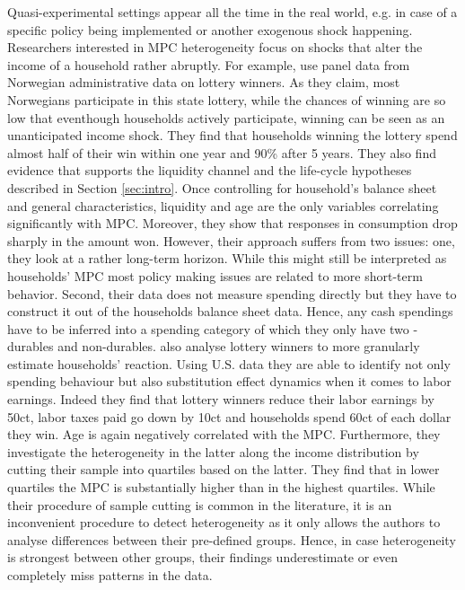 Quasi-experimental settings appear all the time in the real world, e.g. in case of a specific policy being implemented or another exogenous shock happening. Researchers interested in MPC heterogeneity focus on shocks that alter the income of a household rather abruptly. For example, \cite{fagereng_etal} use panel data from Norwegian administrative data on lottery winners. As they claim, most Norwegians participate in this state lottery, while the chances of winning are so low that eventhough households actively participate, winning can be seen as an unanticipated income shock. They find that households winning the lottery spend almost half of their win within one year and 90\% after 5 years. They also find evidence that supports the liquidity channel and the life-cycle hypotheses described in Section \ref{sec:intro}. Once controlling for household's balance sheet and general characteristics, liquidity and age are the only variables correlating significantly with MPC. Moreover, they show that responses in consumption drop sharply in the amount won. However, their approach suffers from two issues: one, they look at a rather long-term horizon. While this might still be interpreted as households' MPC most policy making issues are related to more short-term behavior. Second, their data does not measure spending directly but they have to construct it out of the households balance sheet data. Hence, any cash spendings have to be inferred into a spending category of which they only have two - durables and non-durables. \cite{golosov_etal} also analyse lottery winners to more granularly estimate households' reaction. Using U.S. data they are able to identify not only spending behaviour but also substitution effect dynamics when it comes to labor earnings. Indeed they find that lottery winners reduce their labor earnings by 50ct, labor taxes paid go down by 10ct and households spend 60ct of each dollar they win. Age is again negatively correlated with the MPC. Furthermore, they investigate the heterogeneity in the latter along the income distribution by cutting their sample into quartiles based on the latter. They find that in lower quartiles the MPC is substantially higher than in the highest quartiles. While their procedure of sample cutting is common in the literature, it is an inconvenient procedure to detect heterogeneity as it only allows the authors to analyse differences between their pre-defined groups. Hence, in case heterogeneity is strongest between other groups, their findings underestimate or even completely miss patterns in the data. \\
